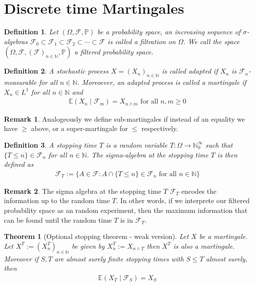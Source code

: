 \documentclass[11pt,a4paper, final]{article}
\newtheorem{thm}{Theorem}[section]
\newtheorem{defn}{Definition}[section]
\theoremstyle{definition}
\newtheorem{rem}{Remark}[section]
\begin{document}
\section{Discrete time Martingales}
\begin{defn} Let $(\Omega, \mathcal{F}, \mathbb{P})$ be a probability space, an increasing sequence of $\sigma$-algebras $\mathcal{F}_0 \subset \mathcal{F}_1 \subset \mathcal{F}_2 \subset \cdots \subset \mathcal{F}$ is called a filtration on $\Omega$. We call the space $(\Omega, \mathcal{F}, (\mathcal{F})_{n \in \mathbb{N}}, \mathbb{P})$ a filtered probability space. 
\end{defn}
\begin{defn} A stochastic process $X=(X_n)_{n \in \mathbb{N}}$ is called adapted if $X_n$ is $\mathcal{F}_n$-measurable for all $n \in \mathbb{N}$. Moreoever, an adapted process is called a martingale if $X_n \in L^1$ for all $n \in \mathbb{N}$ and 
\begin{align*}
\mathbb{E}(X_n \mid \mathcal{F}_m) = X_{n \wedge m } \text{ for all } n,m \geq 0 
\end{align*}
\end{defn}
\begin{rem} Analogeously we define sub-martingales if instead of an equality we have $\geq$ above, or a super-martingale for $\leq$ respectively. 
\end{rem}
\begin{defn} A stopping time $T$ is a random variable $T: \Omega \to \mathbb{N}_0^\infty$ such that $\lbrace T \leq n \rbrace \in \mathcal{F}_n$ for all $n \in \mathbb{N}$. The sigma-algebra at the stopping time $T$ is then defined as
\begin{align*}
\mathcal{F}_T := \lbrace A \in \mathcal{F}: A \cap \lbrace T \leq n \rbrace \in \mathcal{F}_n \text{ for all } n \in \mathbb{N} \rbrace 
\end{align*}
\end{defn}
\begin{rem} The sigma algebra at the stopping time $T$ $\mathcal{F}_T$ encodes the information up to the random time $T$. In other words, if we interprete our filtered probability space as an random experiment, then the maximum information that can be found until the random time $T$ is in $\mathcal{F}_T.$
\end{rem}
\begin{thm}[Optional stopping theorem - weak version] Let $X$ be a martingale. Let $X^T:=(X_n^T)_{n \in \mathbb{N}}$ be given by $X_n^T:= X_{n \wedge T}$ then $X^T$ is also a martingale. Moreover if $S, T$ are almost surely finite stopping times with $S \leq T$ almost surely, then
\begin{align*}
\mathbb{E}(X_T \mid \mathcal{F}_S) = X_S
\end{align*}
\end{thm}
\end{document}
